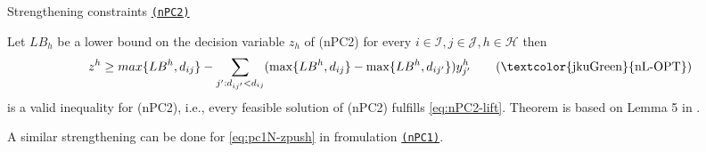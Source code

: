 \documentclass[utf8,aspectratio=169,ngerman,english]{beamer}
\renewcommand{\emph}[1]{\textcolor{jkuGreen}{#1}}
\newcommand{\nPC}{\hyperref[eq:nPC]{\texttt{(nPC1)}}}
\newcommand{\nPCY}{\hyperref[eq:nPCY]{\texttt{(nPC2)}}}
\begin{document}

\begin{frame}{Strengthening constraints \nPCY}
    \vspace{-2pt}
    \begin{lemma}\label{theorem:strength}
        Let $LB_h$ be a lower bound on the decision variable $z_h$ of (nPC2) for every $i \in \mathcal I, j \in \mathcal J, h \in \mathcal H$ then
        \begin{equation}
            z^h \geq max\{LB^h, d_{ij}\} - \sum_{j':d_{ij'} < d_{ij}} (\max \{\textit{$LB^h$}, d_{ij}\} - \max \{\textit{$LB^h$}, d_{ij'}\})y_{j'}^h  \label{eq:nPC2-lift} \tag{\emph{nL-OPT}}
        \end{equation} 
        is a valid inequality for (nPC2), i.e., every feasible solution of (nPC2) fulfills \eqref{eq:nPC2-lift}.
        Theorem is based on Lemma 5 in \textcite{GAAR2022}.
    \end{lemma}
    A similar strengthening can be done for \eqref{eq:pc1N-zpush} in fromulation \nPC. 
\end{frame}
\end{document}

